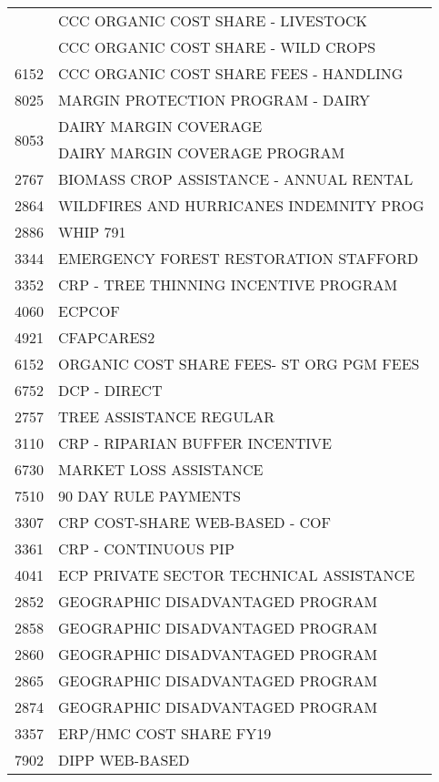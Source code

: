 \begin{longtable}{ll}
 & CCC ORGANIC COST SHARE - LIVESTOCK \\
 & CCC ORGANIC COST SHARE - WILD CROPS \\
\cline{1-2}
6152 & CCC ORGANIC COST SHARE FEES - HANDLING \\
\cline{1-2}
8025 & MARGIN PROTECTION PROGRAM - DAIRY \\
\cline{1-2}
\multirow[t]{2}{*}{8053} & DAIRY MARGIN COVERAGE \\
 & DAIRY MARGIN COVERAGE PROGRAM \\
\cline{1-2}
2767 & BIOMASS CROP ASSISTANCE - ANNUAL RENTAL \\
\cline{1-2}
2864 & WILDFIRES AND HURRICANES INDEMNITY PROG \\
\cline{1-2}
2886 & WHIP 791 \\
\cline{1-2}
3344 & EMERGENCY FOREST RESTORATION STAFFORD \\
\cline{1-2}
3352 & CRP - TREE THINNING INCENTIVE PROGRAM \\
\cline{1-2}
4060 & ECPCOF \\
\cline{1-2}
4921 & CFAPCARES2 \\
\cline{1-2}
6152 & ORGANIC COST SHARE FEES- ST ORG PGM FEES \\
\cline{1-2}
6752 & DCP - DIRECT \\
\cline{1-2}
2757 & TREE ASSISTANCE REGULAR \\
\cline{1-2}
3110 & CRP - RIPARIAN BUFFER INCENTIVE \\
\cline{1-2}
6730 & MARKET LOSS ASSISTANCE \\
\cline{1-2}
7510 & 90 DAY RULE PAYMENTS \\
\cline{1-2}
3307 & CRP COST-SHARE WEB-BASED - COF \\
\cline{1-2}
3361 & CRP - CONTINUOUS PIP \\
\cline{1-2}
4041 & ECP PRIVATE SECTOR TECHNICAL ASSISTANCE \\
\cline{1-2}
2852 & GEOGRAPHIC DISADVANTAGED PROGRAM \\
\cline{1-2}
2858 & GEOGRAPHIC DISADVANTAGED PROGRAM \\
\cline{1-2}
2860 & GEOGRAPHIC DISADVANTAGED PROGRAM \\
\cline{1-2}
2865 & GEOGRAPHIC DISADVANTAGED PROGRAM \\
\cline{1-2}
2874 & GEOGRAPHIC DISADVANTAGED PROGRAM \\
\cline{1-2}
3357 & ERP/HMC COST SHARE FY19 \\
\cline{1-2}
7902 & DIPP WEB-BASED \\
\cline{1-2}

\end{longtable}
